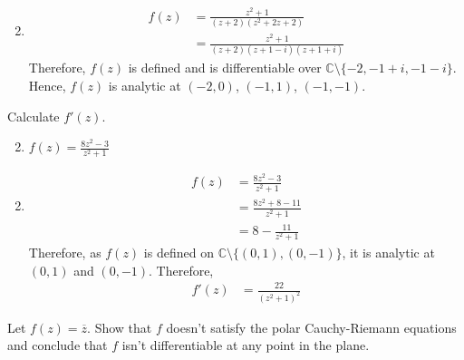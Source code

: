 \documentclass[fleqn, a4paper, 11pt, oneside]{amsart}
\theoremstyle{definition}
\theoremstyle{theorem}
\begin{document}
\begin{solution}
	\begin{enumerate}[leftmargin=*]
		\setcounter{enumi}{1}
		\item
			\begin{align*}
				f(z) & = \frac{z^2 + 1}{(z + 2) \left( z^2 + 2 z + 2 \right)} \\
                                     & = \frac{z^2 + 1}{(z + 2) (z + 1 - i) (z + 1 + i)}
			\end{align*}
			Therefore, $f(z)$ is defined and is differentiable over $\mathbb{C} \setminus \{-2 , -1 + i , -1 - i\}$.\\
			Hence, $f(z)$ is analytic at $(-2,0)$, $(-1,1)$, $(-1,-1)$.
	\end{enumerate}
\end{solution}

\setcounter{question}{3}
\begin{question}
	Calculate $f'(z)$.
	\begin{enumerate}
		\setcounter{enumi}{1}
		\item $f(z) = \frac{8 z^2 - 3}{z^2 + 1}$
	\end{enumerate}
\end{question}

\begin{solution}
	\begin{enumerate}
		\setcounter{enumi}{1}
		\item
			\begin{align*}
				f(z) & = \frac{8 z^2 - 3}{z^2 + 1}      \\
                                     & = \frac{8 z^2 + 8 - 11}{z^2 + 1} \\
                                     & = 8 - \frac{11}{z^2 + 1}
			\end{align*}
			Therefore, as $f(z)$ is defined on $\mathbb{C} \setminus \{(0,1),(0,-1)\}$, it is analytic at $(0,1)$ and $(0,-1)$.
			Therefore,
			\begin{align*}
				f'(z) & = \frac{22}{\left( z^2 + 1 \right)^2}
			\end{align*}
	\end{enumerate}
\end{solution}

\setcounter{question}{5}
\begin{question}
	Let $f(z) = \overline{z}$.
	Show that $f$ doesn't satisfy the polar Cauchy-Riemann equations and conclude that $f$ isn't differentiable at any point in the plane.
\end{question}
\end{document}
